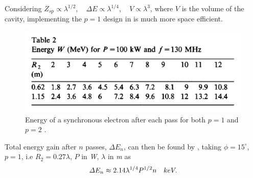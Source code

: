 \documentclass[a4paper,oneside,12pt]{report}
\numberwithin{equation}{chapter}
\begin{document}
Considering $Z_{sp} \propto \lambda^{1/2}$, \,\,\, $\Delta E \propto \lambda^{1/4}$, \,\,\,   $V \propto \lambda^3$, where $V$ is the volume of the cavity, implementing the $p=1$ design in  is much more space efficient.
\begin{figure}[H]
    \centering
    \includegraphics[width=.9\textwidth]{./figures/pottier_table2.png}
    \caption{Energy of a synchronous electron after each pass for both $p=1$ and $p=2$ \cite{rhodo_pottier}.}
    \label{fig:pottier_table2}
\end{figure}
Total energy gain after $n$ passes, $\Delta E_n$, can then be found by , taking $\phi = 15^\circ$, $p=1$, i.e $R_2 = 0.27 \lambda$, $P$ in \textit{W}, $\lambda$ in \textit{m} as
\vspace{-10pt}\begin{equation}
    \label{eq:W_total_gain_pottier}
    \Delta E_n \approx 2.14 \lambda^{1/4} P^{1/2} n \quad keV .
\vspace{-10pt}\end{equation}
\end{document}
